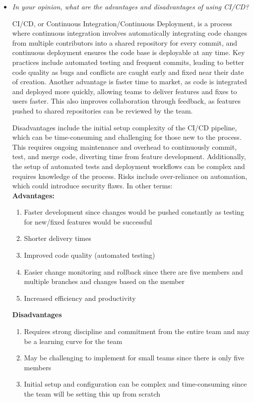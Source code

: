 \documentclass{article}
\begin{document}
\begin{itemize}
    \item \textit{In your opinion, what are the advantages and disadvantages of using CI/CD?}

    CI/CD, or Continuous Integration/Continuous Deployment, is a process where continuous integration involves automatically integrating code changes from multiple contributors into a shared repository for every commit, and continuous deployment ensures the code base is deployable at any time. Key practices include automated testing and frequent commits, leading to better code quality as bugs and conflicts are caught early and fixed near their date of creation. Another advantage is faster time to market, as code is integrated and deployed more quickly, allowing teams to deliver features and fixes to users faster. This also improves collaboration through feedback, as features pushed to shared repositories can be reviewed by the team.

    Disadvantages include the initial setup complexity of the CI/CD pipeline, which can be time-consuming and challenging for those new to the process. This requires ongoing maintenance and overhead to continuously commit, test, and merge code, diverting time from feature development. Additionally, the setup of automated tests and deployment workflows can be complex and requires knowledge of the process. Risks include over-reliance on automation, which could introduce security flaws.
    In other terms:\\
    \textbf{Advantages:}
    \begin{enumerate}
      \item Faster development since changes would be pushed constantly as testing for new/fixed features would be successful
      \item Shorter delivery times
      \item Improved code quality (automated testing)
      \item Easier change monitoring and rollback since there are five members and multiple branches and changes based on the member
      \item Increased efficiency and productivity
    \end{enumerate}
    \textbf{Disadvantages}
    \begin{enumerate}
      \item Requires strong discipline and commitment from the entire team and may be a learning curve for the team
      \item May be challenging to implement for small teams since there is only five members
      \item Initial setup and configuration can be complex and time-consuming since the team will be setting this up from scratch
    \end{enumerate}

\end{itemize}
\end{document}
